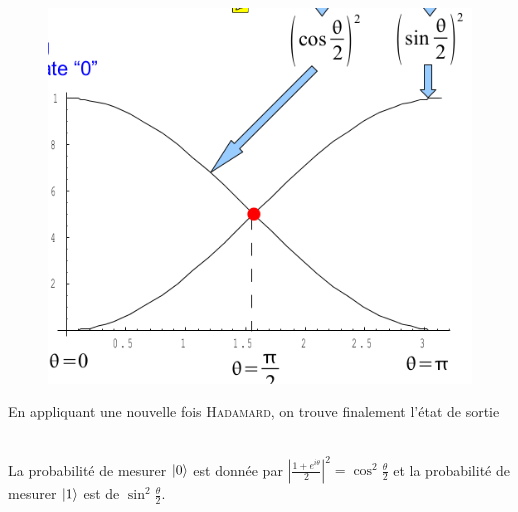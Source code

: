 	\begin{figure}
	\vspace{-8mm}
	\includegraphics[scale=0.2]{ch3/image4}
	\end{figure}
En appliquant une nouvelle fois \textsc{Hadamard}, on trouve finalement l'état de sortie\\	
\ 

La probabilité de mesurer $\ket0$ est donnée par $\left|\frac{1+e^{i\theta}}{2} \right|^2 = \cos^2\frac{\theta}{2}$ et la probabilité de mesurer $\ket1$ est de $\sin^2\frac{\theta}{2}$.\\

